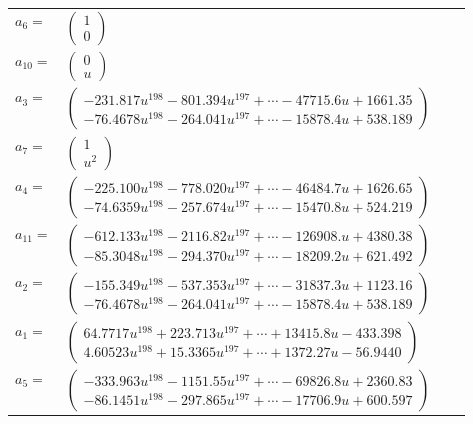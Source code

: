 \documentclass[1p]{elsarticle_modified}
\theoremstyle{definition}
\begin{document}
\begin{tabular}{m{7pt} m{180pt} m{7pt} m{180pt} }
\flushright $a_{6}=$&$\begin{pmatrix}1\\0\end{pmatrix}$ \\
\flushright $a_{10}=$&$\begin{pmatrix}0\\u\end{pmatrix}$ \\
\flushright $a_{3}=$&$\begin{pmatrix}-231.817 u^{198}-801.394 u^{197}+\cdots-47715.6 u+1661.35\\-76.4678 u^{198}-264.041 u^{197}+\cdots-15878.4 u+538.189\end{pmatrix}$ \\
\flushright $a_{7}=$&$\begin{pmatrix}1\\u^2\end{pmatrix}$ \\
\flushright $a_{4}=$&$\begin{pmatrix}-225.100 u^{198}-778.020 u^{197}+\cdots-46484.7 u+1626.65\\-74.6359 u^{198}-257.674 u^{197}+\cdots-15470.8 u+524.219\end{pmatrix}$ \\
\flushright $a_{11}=$&$\begin{pmatrix}-612.133 u^{198}-2116.82 u^{197}+\cdots-126908. u+4380.38\\-85.3048 u^{198}-294.370 u^{197}+\cdots-18209.2 u+621.492\end{pmatrix}$ \\
\flushright $a_{2}=$&$\begin{pmatrix}-155.349 u^{198}-537.353 u^{197}+\cdots-31837.3 u+1123.16\\-76.4678 u^{198}-264.041 u^{197}+\cdots-15878.4 u+538.189\end{pmatrix}$ \\
\flushright $a_{1}=$&$\begin{pmatrix}64.7717 u^{198}+223.713 u^{197}+\cdots+13415.8 u-433.398\\4.60523 u^{198}+15.3365 u^{197}+\cdots+1372.27 u-56.9440\end{pmatrix}$ \\
\flushright $a_{5}=$&$\begin{pmatrix}-333.963 u^{198}-1151.55 u^{197}+\cdots-69826.8 u+2360.83\\-86.1451 u^{198}-297.865 u^{197}+\cdots-17706.9 u+600.597\end{pmatrix}$ \\

\end{tabular}
\end{document}
